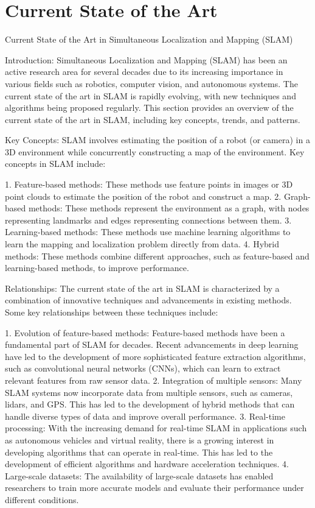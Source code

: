 \documentclass[conference]{IEEEtran}
\begin{document}
\section{Current State of the Art}
Current State of the Art in Simultaneous Localization and Mapping (SLAM)

Introduction:
Simultaneous Localization and Mapping (SLAM) has been an active research area for several decades due to its increasing importance in various fields such as robotics, computer vision, and autonomous systems. The current state of the art in SLAM is rapidly evolving, with new techniques and algorithms being proposed regularly. This section provides an overview of the current state of the art in SLAM, including key concepts, trends, and patterns.

Key Concepts:
SLAM involves estimating the position of a robot (or camera) in a 3D environment while concurrently constructing a map of the environment. Key concepts in SLAM include:

1. Feature-based methods: These methods use feature points in images or 3D point clouds to estimate the position of the robot and construct a map.
2. Graph-based methods: These methods represent the environment as a graph, with nodes representing landmarks and edges representing connections between them.
3. Learning-based methods: These methods use machine learning algorithms to learn the mapping and localization problem directly from data.
4. Hybrid methods: These methods combine different approaches, such as feature-based and learning-based methods, to improve performance.

Relationships:
The current state of the art in SLAM is characterized by a combination of innovative techniques and advancements in existing methods. Some key relationships between these techniques include:

1. Evolution of feature-based methods: Feature-based methods have been a fundamental part of SLAM for decades. Recent advancements in deep learning have led to the development of more sophisticated feature extraction algorithms, such as convolutional neural networks (CNNs), which can learn to extract relevant features from raw sensor data.
2. Integration of multiple sensors: Many SLAM systems now incorporate data from multiple sensors, such as cameras, lidars, and GPS. This has led to the development of hybrid methods that can handle diverse types of data and improve overall performance.
3. Real-time processing: With the increasing demand for real-time SLAM in applications such as autonomous vehicles and virtual reality, there is a growing interest in developing algorithms that can operate in real-time. This has led to the development of efficient algorithms and hardware acceleration techniques.
4. Large-scale datasets: The availability of large-scale datasets has enabled researchers to train more accurate models and evaluate their performance under different conditions.
\end{document}
